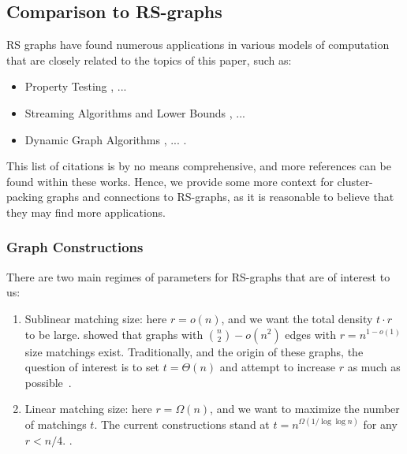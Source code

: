 \documentclass[11pt]{article}
\theoremstyle{definition}
\begin{document}
\subsection{Comparison to RS-graphs}\label{app:cpg-parameters}

 RS graphs have found numerous applications in various models of computation that are closely related to the topics of this paper, such as:  
 \begin{itemize}
 	\item Property Testing \cite{Alon01,FischerLNRRS02}, ... 
 	\item Streaming Algorithms and Lower Bounds \cite{GoelKK12,Kapralov13,AssadiKLY16,AssadiR20,AssadiBKL23,AssadiS23}, ...
 	\item Dynamic Graph Algorithms \cite{AssadiBKL23,BehnezhadG24,AssadiKK25}, ... .
\end{itemize}
This list of citations is by no means comprehensive, and more references can be found within these works. Hence, we provide some more context for cluster-packing graphs and connections to RS-graphs, as it is reasonable to believe that they may find more applications. 

\subsubsection*{Graph Constructions}
There are two main regimes of parameters for RS-graphs that are of interest to us:
\begin{enumerate}[label=$(\roman*)$]
	\item Sublinear matching size: here $r = o(n)$, and we want the total density $t \cdot r$ to be large. \cite{AlonMS12} showed that graphs with $\binom{n}{2} - o(n^2)$ edges with $r = n^{1-o(1)}$ size matchings exist.  
	Traditionally, and the origin of these graphs, the question of interest is to set $t=\Theta(n)$ and attempt to increase $r$ as much as possible~\cite{RuzsaS78}. 
	\item Linear matching size: here $r = \Omega(n)$, and we want to maximize the number of matchings $t$. The current constructions stand at $t = n^{\Omega(1/\log \log n)}$ for any $r < n/4$. \cite{FischerLNRRS02,GoelKK12}.
\end{enumerate}
\end{document}
